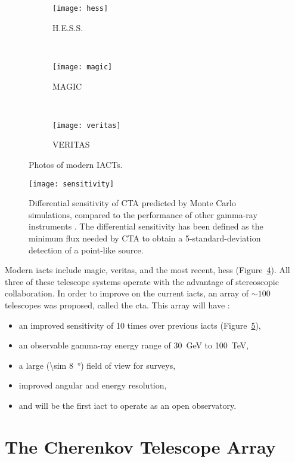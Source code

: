 \begin{figure}
  \centering
  \begin{subfigure}[b]{0.35\textwidth}
  \texttt{[image: hess]}
  \caption{H.E.S.S.}
  \label{fig:hess}
  \end{subfigure}
  ~
  \begin{subfigure}[b]{0.35\textwidth}
  \texttt{[image: magic]}
  \caption{MAGIC}
  \label{fig:magic}
  \end{subfigure}
  ~
  \begin{subfigure}[b]{0.45\textwidth}
  \texttt{[image: veritas]}
  \caption{VERITAS}
  \label{fig:veritas}
  \end{subfigure}
  \caption{Photos of modern IACTs.}
  \label{fig:iacts}
\end{figure}

\begin{figure}
	\centering\texttt{[image: sensitivity]} 
	\caption[Differential sensitivity of CTA.]{Differential sensitivity of CTA predicted by Monte Carlo simulations, compared to the performance of other gamma-ray instruments \cite{cta-performance}. The differential sensitivity has been defined as the minimum flux needed by CTA to obtain a 5-standard-deviation detection of a point-like source.}
	\label{fig:sensitivity}
\end{figure}

Modern \glspl{iact} include \gls{magic}, \gls{veritas}, and the most recent, \gls{hess} (Figure~\ref{fig:iacts}). All three of these telescope systems operate with the advantage of stereoscopic collaboration. In order to improve on the current \glspl{iact}, an array of ${\sim} 100$ telescopes was proposed, called the \gls{cta}. This array will have \cite{Acharya2013}:
\begin{itemize}
\item an improved sensitivity of 10 times over previous \glspl{iact} (Figure~\ref{fig:sensitivity}),
\item an observable gamma-ray energy range of \SI{30}{GeV} to \SI{100}{TeV},
\item a large (\SI{\sim 8}{\degree}) field of view for surveys,
\item improved angular and energy resolution,
\item and will be the first \gls{iact} to operate as an open observatory.
\end{itemize}

\section{The Cherenkov Telescope Array}

